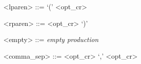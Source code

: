 \vs

\begin{grammar}
  <rbrace> ::= <opt_cr> `}'
\end{grammar}

\vs

\begin{grammar}
  <lparen> ::= `(' <opt_cr>
\end{grammar}

\vs

\begin{grammar}
  <rparen> ::= <opt_cr> `)'
\end{grammar}

\vs

\begin{grammar}
  <empty> ::= \emph{empty production}
\end{grammar}

\vs

\begin{grammar}
  <comma_sep> ::= <opt_cr> `,' <opt_cr>
\end{grammar}
